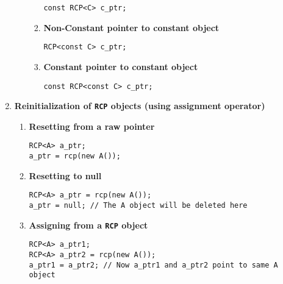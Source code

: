 \documentclass[pdf,ps2pdf,11pt]{SANDreport}
\begin{document}
\begin{enumerate}
\begin{enumerate}
\begin{enumerate}
{\small\begin{verbatim}
const RCP<C> c_ptr;
\end{verbatim}}
%
\item {\bf Non-Constant pointer to constant object }
{\small\begin{verbatim}
RCP<const C> c_ptr;
\end{verbatim}}
%
\item {\bf Constant pointer to constant object }
{\small\begin{verbatim}
const RCP<const C> c_ptr;
\end{verbatim}}
%
\end{enumerate}
%
\end{enumerate}

\item {\bf Reinitialization of \texttt{RCP} objects (using assignment operator)}
%
\begin{enumerate}
%
\item {\bf Resetting from a raw pointer}
%
{\small\begin{verbatim}
RCP<A> a_ptr;
a_ptr = rcp(new A());
\end{verbatim}}
%
\item {\bf Resetting to null}
%
{\small\begin{verbatim}
RCP<A> a_ptr = rcp(new A());
a_ptr = null; // The A object will be deleted here
\end{verbatim}}
%
\item {\bf Assigning from a \texttt{RCP} object}
%
{\small\begin{verbatim}
RCP<A> a_ptr1;
RCP<A> a_ptr2 = rcp(new A());
a_ptr1 = a_ptr2; // Now a_ptr1 and a_ptr2 point to same A object
\end{verbatim}}
%
\end{enumerate}


\end{enumerate}
\end{document}
